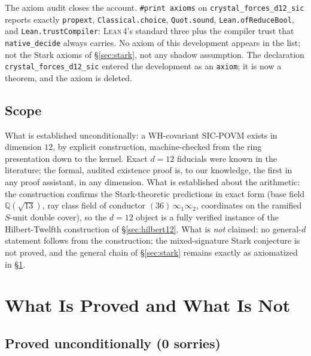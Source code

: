 \documentclass[12pt,a4paper]{article}
\newcommand{\Lean}{\textsc{Lean\,4}}
\begin{document}
The axiom audit closes the account.  \texttt{\#print axioms} on
\texttt{crystal\_forces\_d12\_sic} reports exactly
\texttt{propext}, \texttt{Classical.choice}, \texttt{Quot.sound},
\texttt{Lean.ofReduceBool}, and \texttt{Lean.trustCompiler}: \Lean{}'s
standard three plus the compiler trust that \texttt{native\_decide} always
carries.  No axiom of this development appears in the list; not the Stark
axioms of \S\ref{sec:stark}, not any shadow assumption.  The declaration
\texttt{crystal\_forces\_d12\_sic} entered the development as an
\texttt{axiom}; it is now a theorem, and the axiom is deleted.

\subsection{Scope}

What is established unconditionally: a WH-covariant SIC-POVM exists in
dimension $12$, by explicit construction, machine-checked from the ring
presentation down to the kernel.  Exact $d=12$ fiducials were known in the
literature; the formal, audited existence proof is, to our knowledge, the
first in any proof assistant, in any dimension.  What is established about
the arithmetic: the construction confirms the Stark-theoretic predictions
in exact form (base field $\mathbb{Q}(\sqrt{13})$, ray class field of
conductor $(36)\,\infty_1\infty_2$, coordinates on the ramified $S$-unit
double cover), so the $d=12$ object is a fully verified instance of the
Hilbert-Twelfth construction of \S\ref{sec:hilbert12}.  What is \emph{not}
claimed: no general-$d$ statement follows from the construction; the
mixed-signature Stark conjecture is not proved, and the general chain of
\S\ref{sec:stark} remains exactly as axiomatized in \S\ref{sec:gaps}.

\section{What Is Proved and What Is Not}
\label{sec:gaps}

\subsection{Proved unconditionally (0 sorries)}
\end{document}
